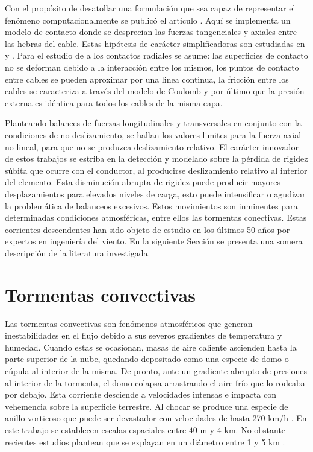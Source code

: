 Con el propósito de desatollar una formulación que sea capaz de representar el fenómeno computacionalmente se publicó el articulo \cite{Foti2016}. Aquí se implementa un modelo de contacto donde se desprecian las fuerzas tangenciales y axiales entre las hebras del cable. Estas hipótesis de carácter simplificadoras son estudiadas en \cite{costello1990average} y \cite{rawlins2005flexure}. Para el estudio de a los contactos radiales se asume: las superficies de contacto no se deforman debido a la interacción entre los mismos, los puntos de contacto entre cables se pueden aproximar por una linea continua, la fricción entre los cables se caracteriza a través del modelo de Coulomb y por último que la presión externa es idéntica para todos los cables de la misma capa. 

Planteando balances de fuerzas longitudinales y transversales en conjunto con la condiciones de no deslizamiento, se hallan los valores limites para la fuerza axial no lineal, para que no se produzca deslizamiento relativo.
El carácter innovador de estos trabajos se estriba en la detección y modelado sobre la pérdida de rigidez súbita que ocurre con el conductor, al producirse deslizamiento relativo al interior del elemento. Esta disminución  abrupta de rigidez puede producir mayores desplazamientos para elevados niveles de carga, esto puede intensificar o agudizar la problemática de balanceos excesivos. Estos movimientos son inminentes para determinadas condiciones atmosféricas, entre ellos las tormentas conectivas. Estas corrientes descendentes han sido objeto de estudio en los últimos 50 años por expertos en ingeniería del viento. En la siguiente Sección se presenta una somera descripción de la literatura investigada. 

\section{Tormentas convectivas}\label{Sec:EA:TormentasConvectivas}

Las tormentas convectivas son fenómenos atmosféricos que generan inestabilidades en el flujo debido a sus severos gradientes de temperatura y humedad. Cuando estas se ocasionan, masas de aire caliente ascienden hasta la parte superior de la nube, quedando depositado como una especie de domo o cúpula al interior de la misma. De pronto, ante un gradiente abrupto de presiones al interior de la tormenta, el domo colapsa arrastrando el aire frío que lo rodeaba por debajo. Esta corriente desciende a velocidades intensas e impacta con vehemencia sobre la superficie terrestre. Al chocar se produce una especie de anillo vorticoso que puede ser devastador con velocidades de hasta 270 km/h \textcite{fujita1985downburst}. En este trabajo se establecen escalas espaciales entre $40$ m  y $4$ km. No obstante recientes estudios plantean que se explayan en un diámetro entre 1 y 5 km \textcite{darwish2010dynamic}.

